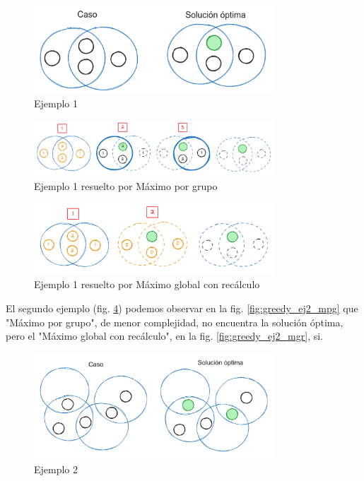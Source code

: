 \begin{figure}[H]
    \centering
    \includegraphics[width=0.8\textwidth]{img/greedy_ej1.png}
    \caption{Ejemplo 1}
    \label{fig:greedy_ej1}
\end{figure}

\begin{figure}[H]
    \centering
    \includegraphics[width=0.8\textwidth]{img/greedy_ej1_mpg.png}
    \caption{Ejemplo 1 resuelto por Máximo por grupo}
    \label{fig:greedy_ej1_mpg}
\end{figure}

\begin{figure}[H]
    \centering
    \includegraphics[width=0.8\textwidth]{img/greedy_ej1_mgr.png}
    \caption{Ejemplo 1 resuelto por Máximo global con recálculo}
    \label{fig:greedy_ej1_mgr}
\end{figure}

El segundo ejemplo (fig. \ref{fig:greedy_ej2}) podemos observar en la fig. \ref{fig:greedy_ej2_mpg} que "Máximo por grupo", de menor complejidad, no encuentra la solución óptima, pero el "Máximo global con recálculo", en la fig. \ref{fig:greedy_ej2_mgr}, si.

\begin{figure}[H]
    \centering
    \includegraphics[width=0.8\textwidth]{img/greedy_ej2.png}
    \caption{Ejemplo 2}
    \label{fig:greedy_ej2}
\end{figure}

